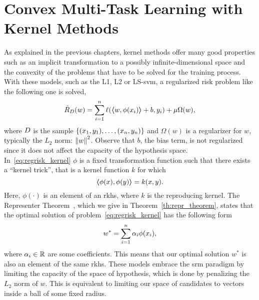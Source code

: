 \section{Convex Multi-Task Learning with Kernel Methods}
\label{sec:convexmlt_kernel}


As explained in the previous chapters, kernel methods offer many good properties such as an implicit transformation to a possibly infinite-dimensional space and the convexity of the problems that have to be solved for the training process. With these models, such as the L1, L2 or LS-\acrshort{svm}, a regularized risk problem like the following one is solved,
\begin{equation}
    \label{eq:regrisk_kernel}
    \emprisk({w}) = \sum_{i=1}^{\nsamples} \lossf(\dotp{w}{\phi({x}_i)} + b, y_i) + \mu \Omega({w}) ,
\end{equation}
where $D$ is the sample $\{(x_1, y_1), \ldots, (x_n, y_n)\}$ and $\Omega(w)$ is a regularizer for ${w}$, typically the $L_2$ norm: $\left\lVert w\right\rVert^2$. Observe that $b$, the bias term, is not regularized since it does not affect the capacity of the hypothesis space.
In~\eqref{eq:regrisk_kernel} $\phi$ is a fixed transformation function such that there exists a ``kernel trick'', that is a kernel function $k$ for which
\begin{equation}
    \nonumber
    \bm{\left\langle} \phi(x), \phi(y) \bm{\right\rangle} = k(x, y).
\end{equation}
Here, $\phi(\cdot)$ is an element of an \acrshort{rkhs}, where $k$ is the reproducing kernel. 
The Representer Theorem~\citep*{ScholkopfHS01}, which we give in Theorem~\ref{th:repr_theorem}, states that the optimal solution of problem~\eqref{eq:regrisk_kernel} has the following form
\begin{equation}
    \nonumber
    w^* = \sum_{i=1}^n \alpha_i \phi(x_i) ,
\end{equation}
where $\alpha_i \in \mathbb{R}$ are some coefficients. This means that our optimal solution $w^*$ is also an element of the same \acrshort{rkhs}.
These models embrace the \acrfull{srm} paradigm by limiting the capacity of the space of hypothesis, which is done by penalizing the $L_2$ norm of $w$. This is equivalent to limiting our space of candidates to vectors inside a ball of some fixed radius.

